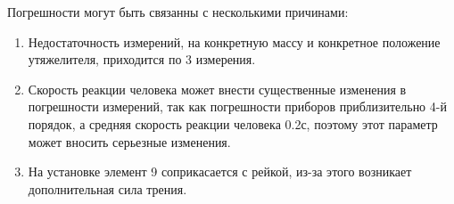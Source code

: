 \documentclass[a4paper]{article}
\begin{document}
Погрешности могут быть связанны с несколькими причинами:

\begin{enumerate}
    \item Недостаточность измерений, на конкретную массу и конкретное положение утяжелителя, приходится по 3 измерения.
    \item Скорость реакции человека может внести существенные изменения в погрешности измерений, так как погрешности приборов приблизительно 4-й порядок, а средняя скорость реакции человека 0.2с, поэтому этот параметр может вносить серьезные изменения.
    \item На установке элемент 9 соприкасается с рейкой, из-за этого возникает дополнительная сила трения.
\end{enumerate}
\end{document}
